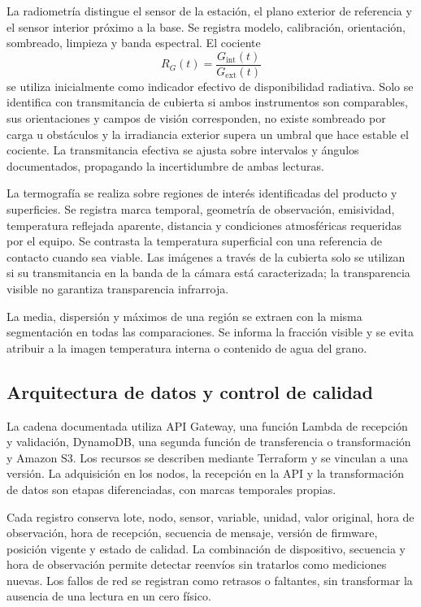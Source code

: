 La radiometría distingue el sensor de la estación, el plano exterior de referencia y el sensor interior próximo a la base. Se registra modelo, calibración, orientación, sombreado, limpieza y banda espectral. El cociente
\begin{equation}
R_G(t)=\frac{G_{\mathrm{int}}(t)}{G_{\mathrm{ext}}(t)}
\label{met:cociente_radiativo}
\end{equation}
se utiliza inicialmente como indicador efectivo de disponibilidad radiativa. Solo se identifica con transmitancia de cubierta si ambos instrumentos son comparables, sus orientaciones y campos de visión corresponden, no existe sombreado por carga u obstáculos y la irradiancia exterior supera un umbral que hace estable el cociente. La transmitancia efectiva se ajusta sobre intervalos y ángulos documentados, propagando la incertidumbre de ambas lecturas.

La termografía se realiza sobre regiones de interés identificadas del producto y superficies. Se registra marca temporal, geometría de observación, emisividad, temperatura reflejada aparente, distancia y condiciones atmosféricas requeridas por el equipo. Se contrasta la temperatura superficial con una referencia de contacto cuando sea viable. Las imágenes a través de la cubierta solo se utilizan si su transmitancia en la banda de la cámara está caracterizada; la transparencia visible no garantiza transparencia infrarroja.

La media, dispersión y máximos de una región se extraen con la misma segmentación en todas las comparaciones. Se informa la fracción visible y se evita atribuir a la imagen temperatura interna o contenido de agua del grano.

\subsection{Arquitectura de datos y control de calidad}

La cadena documentada utiliza API Gateway, una función Lambda de recepción y validación, DynamoDB, una segunda función de transferencia o transformación y Amazon S3. Los recursos se describen mediante Terraform y se vinculan a una versión. La adquisición en los nodos, la recepción en la API y la transformación de datos son etapas diferenciadas, con marcas temporales propias.

Cada registro conserva lote, nodo, sensor, variable, unidad, valor original, hora de observación, hora de recepción, secuencia de mensaje, versión de firmware, posición vigente y estado de calidad. La combinación de dispositivo, secuencia y hora de observación permite detectar reenvíos sin tratarlos como mediciones nuevas. Los fallos de red se registran como retrasos o faltantes, sin transformar la ausencia de una lectura en un cero físico.

